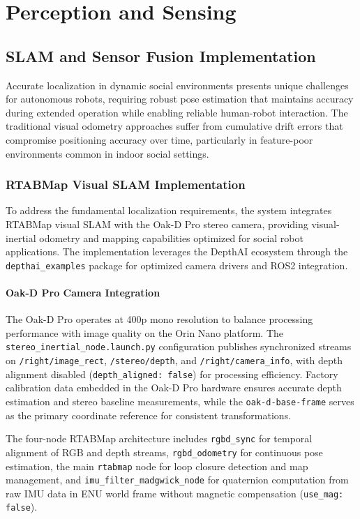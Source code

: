 \section{Perception and Sensing}
\label{sec:perception_sensing}

\subsection{SLAM and Sensor Fusion Implementation}

Accurate localization in dynamic social environments presents unique challenges for autonomous robots, requiring robust pose estimation that maintains accuracy during extended operation while enabling reliable human-robot interaction. The traditional visual odometry approaches suffer from cumulative drift errors that compromise positioning accuracy over time, particularly in feature-poor environments common in indoor social settings.

\subsubsection{RTABMap Visual SLAM Implementation}

To address the fundamental localization requirements, the system integrates RTABMap visual SLAM with the Oak-D Pro stereo camera, providing visual-inertial odometry and mapping capabilities optimized for social robot applications. The implementation leverages the DepthAI ecosystem through the \texttt{depthai\_examples} package for optimized camera drivers and ROS2 integration.

\paragraph{Oak-D Pro Camera Integration}

The Oak-D Pro operates at 400p mono resolution to balance processing performance with image quality on the Orin Nano platform. The \texttt{stereo\_inertial\_node.launch.py} configuration publishes synchronized streams on \texttt{/right/image\_rect}, \texttt{/stereo/depth}, and \texttt{/right/camera\_info}, with depth alignment disabled (\texttt{depth\_aligned: false}) for processing efficiency. Factory calibration data embedded in the Oak-D Pro hardware ensures accurate depth estimation and stereo baseline measurements, while the \texttt{oak-d-base-frame} serves as the primary coordinate reference for consistent transformations.

The four-node RTABMap architecture includes \texttt{rgbd\_sync} for temporal alignment of RGB and depth streams, \texttt{rgbd\_odometry} for continuous pose estimation, the main \texttt{rtabmap} node for loop closure detection and map management, and \texttt{imu\_filter\_madgwick\_node} for quaternion computation from raw IMU data in ENU world frame without magnetic compensation (\texttt{use\_mag: false}).

